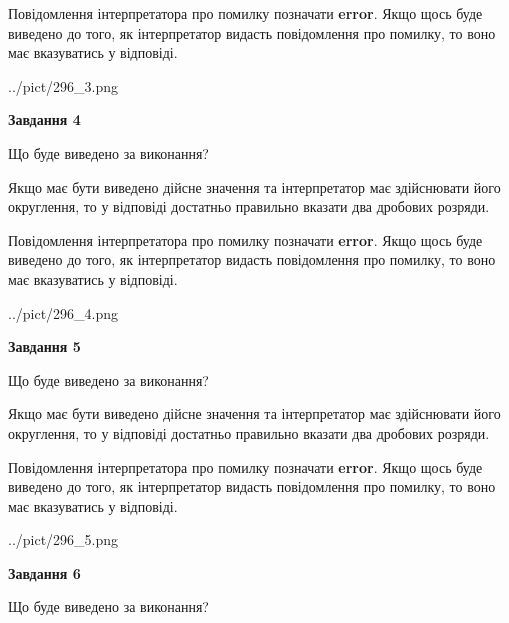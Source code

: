 \documentclass[12pt, ukrainian]{article}
\begin{document}
{\begin {Large}
Повідомлення інтерпретатора про помилку позначати \textbf{error}.
Якщо щось буде виведено до того, як інтерпретатор видасть повідомлення про помилку, 
то воно має вказуватись у відповіді. \par

\begin{center}
	{../pict/296_3.png}
\end{center}
\newpage

{\begin {center}\textbf{Завдання 4}\end {center}}\par
Що буде виведено за виконання? \par

Якщо має бути виведено дійсне значення та інтерпретатор має здійснювати його округлення, 
то у відповіді достатньо правильно вказати два дробових розряди.

Повідомлення інтерпретатора про помилку позначати \textbf{error}.
Якщо щось буде виведено до того, як інтерпретатор видасть повідомлення про помилку, 
то воно має вказуватись у відповіді. \par

\begin{center}
	{../pict/296_4.png}
\end{center}
\newpage

{\begin {center}\textbf{Завдання 5}\end {center}}\par
Що буде виведено за виконання? \par

Якщо має бути виведено дійсне значення та інтерпретатор має здійснювати його округлення, 
то у відповіді достатньо правильно вказати два дробових розряди.

Повідомлення інтерпретатора про помилку позначати \textbf{error}.
Якщо щось буде виведено до того, як інтерпретатор видасть повідомлення про помилку, 
то воно має вказуватись у відповіді. \par

\begin{center}
	{../pict/296_5.png}
\end{center}
\newpage

{\begin {center}\textbf{Завдання 6}\end {center}}\par
Що буде виведено за виконання? \par


\end{Large}}
\end{document}
